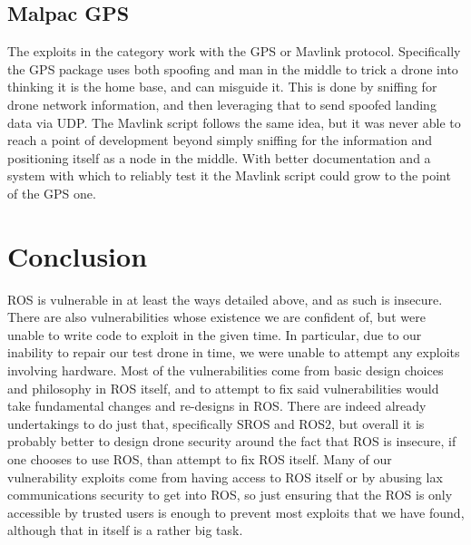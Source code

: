 \documentclass[IEEEtran,letterpaper,10pt,notitlepage,draftclsnofoot,onecolumn]{article}
\begin{document}
\subsection{Malpac GPS}
The exploits in the category work with the GPS or Mavlink protocol.
Specifically the GPS package uses both spoofing and man in the middle to trick a drone into thinking it is the home base, and can misguide it.
This is done by sniffing for drone network information, and then leveraging that to send spoofed landing data via UDP.
The Mavlink script follows the same idea, but it was never able to reach a point of development beyond simply sniffing for the information and positioning itself as a node in the middle.
With better documentation and a system with which to reliably test it the Mavlink script could grow to the point of the GPS one.

\section{Conclusion}
ROS is vulnerable in at least the ways detailed above, and as such is insecure. 
There are also vulnerabilities whose existence we are confident of, but were unable to write code to exploit in the given time. 
In particular, due to our inability to repair our test drone in time, we were unable to attempt any exploits involving hardware. 
Most of the vulnerabilities come from basic design choices and philosophy in ROS itself, and to attempt to fix said vulnerabilities would take fundamental changes and re-designs in ROS. 
There are indeed already undertakings to do just that, specifically SROS and ROS2, but overall it is probably better to design drone security around the fact that ROS is insecure, if one chooses to use ROS, than attempt to fix ROS itself. 
Many of our vulnerability exploits come from having access to ROS itself or by abusing lax communications security to get into ROS, so just ensuring that the ROS is only accessible by trusted users is enough to prevent most exploits that we have found, although that in itself is a rather big task.
\end{document}
